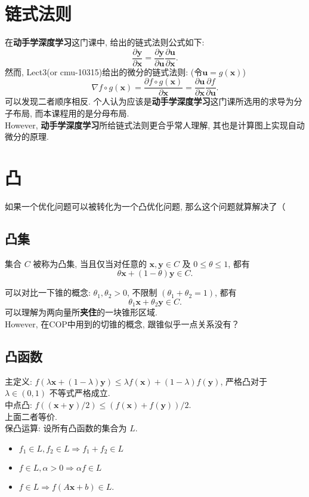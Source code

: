 \documentclass[lang = cn]{elegantpaper}
\begin{document}
\section{链式法则}
\noindent
在\textbf{动手学深度学习}这门课中, 给出的链式法则公式如下:
\begin{equation*}
    \frac{\partial \bm{y}}{\partial \bm{x}} = \frac{\partial \bm{y}}{\partial \bm{u}} \frac{\partial \bm{u}}{\partial \bm{x}}.
\end{equation*}
然而, Lect3(or cmu-10315)给出的微分的链式法则: (令$\bm{u} = g(\bm{x})$)
\begin{equation*}
    \nabla f\circ g(\bm{x}) = \frac{\partial f\circ g(\bm{x})}{\partial \bm{x}} = \frac{\partial \bm{u}}{\partial \bm{x}} \frac{\partial f}{\partial \bm{u}}.
\end{equation*}
可以发现二者顺序相反. 个人认为应该是\textbf{动手学深度学习}这门课所选用的求导为分子布局, 而本课程用的是分母布局.\\
However, \textbf{动手学深度学习}所给链式法则更合乎常人理解, 其也是计算图上实现自动微分的原理.
\section{凸}
\noindent
如果一个优化问题可以被转化为一个凸优化问题, 那么这个问题就算解决了（
\subsection{凸集}
\begin{definition}
    集合 $C$ 被称为凸集, 当且仅当对任意的 $\bm{x},\bm{y} \in C$ 及 $0 \le \theta \le 1$, 都有
\begin{equation*}
    \theta \bm{x} + (1 - \theta)\bm{y} \in C.
\end{equation*}
\end{definition}
可以对比一下锥的概念: $\theta_1,\theta_2 > 0$, 不限制 $(\theta_1 + \theta_2 = 1)$, 都有
\begin{equation*}
    \theta_1 \bm{x} + \theta_2 \bm{y} \in C.
\end{equation*}
可以理解为两向量所\textbf{夹住}的一块锥形区域.\\
However, 在COP中用到的切锥的概念, 跟锥似乎一点关系没有？
\subsection{凸函数}
\noindent
主定义: $f(\lambda \bm{x} + (1 - \lambda)\bm{y}) \le \lambda f(\bm{x}) + (1 - \lambda) f(\bm{y})$, 严格凸对于 $\lambda \in (0,1)$ 不等式严格成立.\\
中点凸: $f((\bm{x}+\bm{y})/2) \le (f(\bm{x}) + f(\bm{y})) / 2$.\\
上面二者等价.\\
保凸运算: 设所有凸函数的集合为 $L$.\\
\begin{itemize}
    \item $f_1 \in L,f_2 \in L \Rightarrow f_1 + f_2 \in L$
    \item $f \in L,\alpha > 0 \Rightarrow \alpha f \in L$
    \item $f \in L \Rightarrow  f(A\bm{x} + b) \in L$.
\end{itemize}
\end{document}
